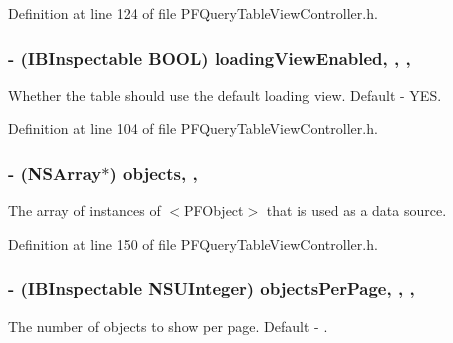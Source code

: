 Definition at line 124 of file P\+F\+Query\+Table\+View\+Controller.\+h.

\hypertarget{interface_p_f_query_table_view_controller_a148dfb629f55cd4e20b0ac3936f365c9}{}
\subsubsection[{loading\+View\+Enabled}]{\setlength{\rightskip}{0pt plus 5cm}-\/ (I\+B\+Inspectable B\+O\+O\+L) loading\+View\+Enabled\hspace{0.3cm}{\ttfamily [read]}, {\ttfamily [write]}, {\ttfamily [nonatomic]}, {\ttfamily [assign]}}\label{interface_p_f_query_table_view_controller_a148dfb629f55cd4e20b0ac3936f365c9}
Whether the table should use the default loading view. Default -\/ {\ttfamily Y\+E\+S}. 

Definition at line 104 of file P\+F\+Query\+Table\+View\+Controller.\+h.

\hypertarget{interface_p_f_query_table_view_controller_a7c13a3b0c79c7b98b534ebfa06d2c194}{}
\subsubsection[{objects}]{\setlength{\rightskip}{0pt plus 5cm}-\/ (N\+S\+Array$\ast$) objects\hspace{0.3cm}{\ttfamily [read]}, {\ttfamily [nonatomic]}, {\ttfamily [copy]}}\label{interface_p_f_query_table_view_controller_a7c13a3b0c79c7b98b534ebfa06d2c194}
The array of instances of $<$\+P\+F\+Object$>$ that is used as a data source. 

Definition at line 150 of file P\+F\+Query\+Table\+View\+Controller.\+h.

\hypertarget{interface_p_f_query_table_view_controller_a7d06a88ac58846f32e9ad109540f1297}{}
\subsubsection[{objects\+Per\+Page}]{\setlength{\rightskip}{0pt plus 5cm}-\/ (I\+B\+Inspectable N\+S\+U\+Integer) objects\+Per\+Page\hspace{0.3cm}{\ttfamily [read]}, {\ttfamily [write]}, {\ttfamily [nonatomic]}, {\ttfamily [assign]}}\label{interface_p_f_query_table_view_controller_a7d06a88ac58846f32e9ad109540f1297}
The number of objects to show per page. Default -\/ {}. 

